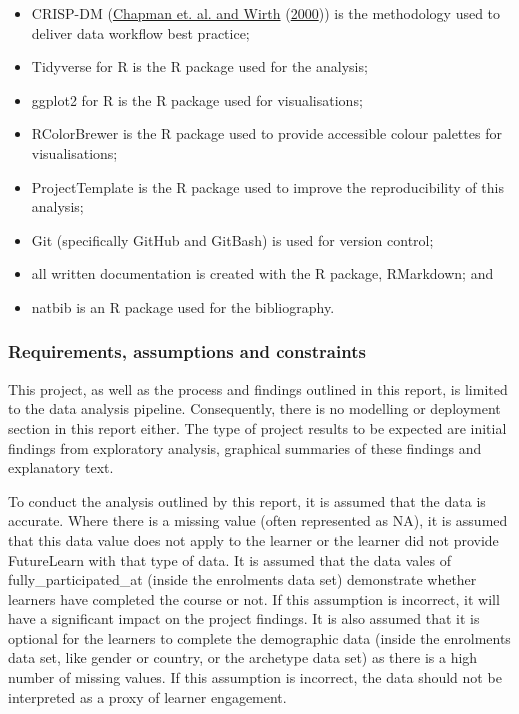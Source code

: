\documentclass[
]{article}
\begin{document}
\begin{itemize}
\item
  CRISP-DM (\protect\hyperlink{ref-CRISP-DM}{Chapman et. al. and Wirth}
  (\protect\hyperlink{ref-CRISP-DM}{2000})) is the methodology used to
  deliver data workflow best practice;
\item
  Tidyverse for R is the R package used for the analysis;
\item
  ggplot2 for R is the R package used for visualisations;
\item
  RColorBrewer is the R package used to provide accessible colour
  palettes for visualisations;
\item
  ProjectTemplate is the R package used to improve the reproducibility
  of this analysis;
\item
  Git (specifically GitHub and GitBash) is used for version control;
\item
  all written documentation is created with the R package, RMarkdown;
  and
\item
  natbib is an R package used for the bibliography.
\end{itemize}

\hypertarget{requirements-assumptions-and-constraints}{%
\subsubsection{Requirements, assumptions and
constraints}\label{requirements-assumptions-and-constraints}}

This project, as well as the process and findings outlined in this
report, is limited to the data analysis pipeline. Consequently, there is
no modelling or deployment section in this report either. The type of
project results to be expected are initial findings from exploratory
analysis, graphical summaries of these findings and explanatory text.

To conduct the analysis outlined by this report, it is assumed that the
data is accurate. Where there is a missing value (often represented as
NA), it is assumed that this data value does not apply to the learner or
the learner did not provide FutureLearn with that type of data. It is
assumed that the data vales of fully\_participated\_at (inside the
enrolments data set) demonstrate whether learners have completed the
course or not. If this assumption is incorrect, it will have a
significant impact on the project findings. It is also assumed that it
is optional for the learners to complete the demographic data (inside
the enrolments data set, like gender or country, or the archetype data
set) as there is a high number of missing values. If this assumption is
incorrect, the data should not be interpreted as a proxy of learner
engagement.
\end{document}
